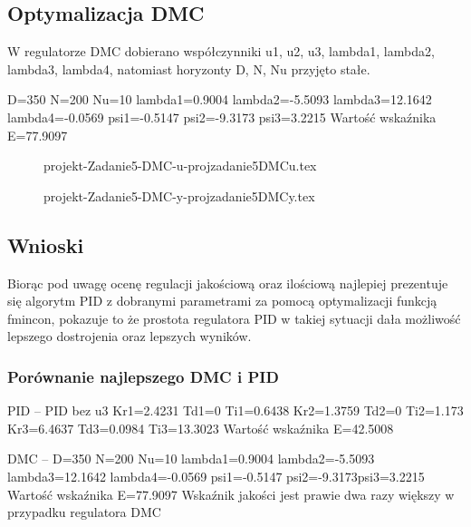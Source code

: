 \subsection{Optymalizacja DMC}

W regulatorze DMC dobierano współczynniki u1, u2, u3, lambda1, lambda2, lambda3, lambda4, natomiast horyzonty
D, N, Nu przyjęto stałe.

D=350 N=200 Nu=10 
lambda1=0.9004 lambda2=-5.5093 lambda3=12.1642 lambda4=-0.0569 
psi1=-0.5147 psi2=-9.3173 psi3=3.2215 
Wartość wskaźnika E=77.9097


\ifdefined\CompileFigures
\begin{figure}[H] 
    \centering
    
    \caption{projekt-Zadanie5-DMC-u-projzadanie5DMCu.tex}
    \label{projekt:zad5:figure:projzadanie5DMCu}
\end{figure}
\fi

\ifdefined\CompileFigures
\begin{figure}[H] 
    \centering
    
    \caption{projekt-Zadanie5-DMC-y-projzadanie5DMCy.tex}
    \label{projekt:zad5:figure:projzadanie5DMCy}
\end{figure}
\fi

\subsection{Wnioski}
Biorąc pod uwagę ocenę regulacji jakościową oraz ilościową najlepiej prezentuje się
algorytm PID z dobranymi parametrami za pomocą optymalizacji funkcją fmincon,
pokazuje to że prostota regulatora PID w takiej sytuacji dała możliwość lepszego
dostrojenia oraz lepszych wyników.
\subsubsection{Porównanie najlepszego DMC i PID}

PID – PID bez u3
\newline
Kr1=2.4231 Td1=0 Ti1=0.6438 Kr2=1.3759 
\newline
Td2=0 Ti2=1.173 Kr3=6.4637
\newline
Td3=0.0984 Ti3=13.3023 
\newline
Wartość wskaźnika E=42.5008

DMC – D=350 N=200 Nu=10 
\newline
lambda1=0.9004 lambda2=-5.5093 lambda3=12.1642 lambda4=-0.0569 
\newline
psi1=-0.5147 psi2=-9.3173psi3=3.2215 
\newline
Wartość wskaźnika E=77.9097
\newline
Wskaźnik jakości jest prawie dwa razy większy w przypadku regulatora DMC


\newpage
